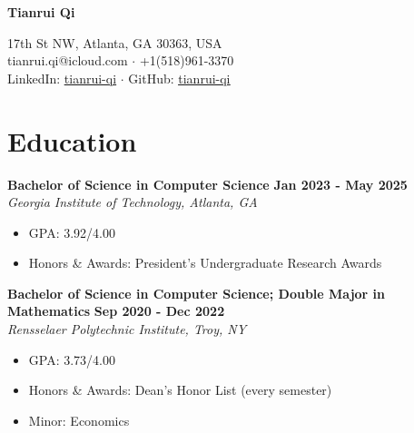 \documentclass[letterpaper, 11pt]{article}
\newcommand{\subsectionvspace}{\vspace{8pt}}
\begin{document}


\begin{minipage}[t]{0.4\textwidth}
    \vspace*{0\baselineskip}\textbf{\Huge Tianrui Qi}
\end{minipage}%
\begin{minipage}[t]{0.6\textwidth}
     17th St NW, Atlanta, GA 30363, USA
    \\
    tianrui.qi@icloud.com 
    $\cdot$ 
    +1(518)961-3370
    \\
    LinkedIn: \href{https://www.linkedin.com/in/tianrui-qi/}{\underline{tianrui-qi}}
    $\cdot$
    GitHub: \href{https://github.com/tianrui-qi}{\underline{tianrui-qi}}
\end{minipage}


\section{Education}


    \textbf{Bachelor of Science in Computer Science} \hfill 
    \textbf{Jan 2023 - May 2025} \\
    \textit{Georgia Institute of Technology, Atlanta, GA}
    \begin{itemize}
        \item GPA: 3.92/4.00
        \item Honors \& Awards: President's Undergraduate Research Awards
    \end{itemize}

    \subsectionvspace

    \textbf{Bachelor of Science in Computer Science; Double Major in Mathematics} \hfill 
    \textbf{Sep 2020 - Dec 2022} \\
    \textit{Rensselaer Polytechnic Institute, Troy, NY}
    \begin{itemize}
        \item GPA: 3.73/4.00
        \item Honors \& Awards: Dean's Honor List (every semester)
        \item Minor: Economics
    \end{itemize}
\end{document}
